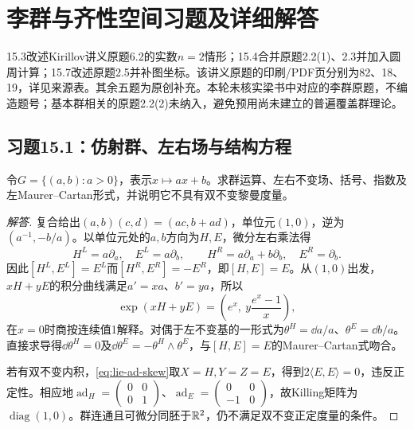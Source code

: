 \section{李群与齐性空间习题及详细解答}
15.3改述Kirillov讲义原题6.2的实数$n=2$情形；15.4合并原题2.2(1)、2.3并加入圆周计算；15.7改述原题2.5并补图坐标。该讲义原题的印刷/PDF页分别为82、18、19，详见来源表。其余五题为原创补充。本轮未核实梁书中对应的李群原题，不编造题号；基本群相关的原题2.2(2)未纳入，避免预用尚未建立的普遍覆盖群理论。

\subsection*{习题15.1：仿射群、左右场与结构方程}
令$G=\{(a,b):a>0\}$，表示$x\mapsto ax+b$。求群运算、左右不变场、括号、指数及左Maurer--Cartan形式，并说明它不具有双不变黎曼度量。
\begin{proof}[解答]
复合给出$(a,b)(c,d)=(ac,b+ad)$，单位元$(1,0)$，逆为$(a^{-1},-b/a)$。以单位元处的$a,b$方向为$H,E$，微分左右乘法得
\[
 H^L=a\partial_a,\quad E^L=a\partial_b,\qquad
 H^R=a\partial_a+b\partial_b,\quad E^R=\partial_b.
\]
因此$[H^L,E^L]=E^L$而$[H^R,E^R]=-E^R$，即$[H,E]=E$。从$(1,0)$出发，$xH+yE$的积分曲线满足$a'=xa$、$b'=ya$，所以
\[
 \exp(xH+yE)=\left(e^x,\ y\frac{e^x-1}{x}\right),
\]
在$x=0$时商按连续值1解释。对偶于左不变基的一形式为$\theta^H=\dd a/a$、$\theta^E=\dd b/a$。直接求导得$\dd\theta^H=0$及$\dd\theta^E=-\theta^H\wedge\theta^E$，与$[H,E]=E$的Maurer--Cartan式吻合。

若有双不变内积，\eqref{eq:lie-ad-skew}取$X=H,Y=Z=E$，得到$2\langle E,E\rangle=0$，违反正定性。相应地$\operatorname{ad}_H=\left(\begin{smallmatrix}0&0\\0&1\end{smallmatrix}\right)$、$\operatorname{ad}_E=\left(\begin{smallmatrix}0&0\\-1&0\end{smallmatrix}\right)$，故Killing矩阵为$\operatorname{diag}(1,0)$。群连通且可微分同胚于$\mathbb{R}^2$，仍不满足双不变正定度量的条件。
\end{proof}

